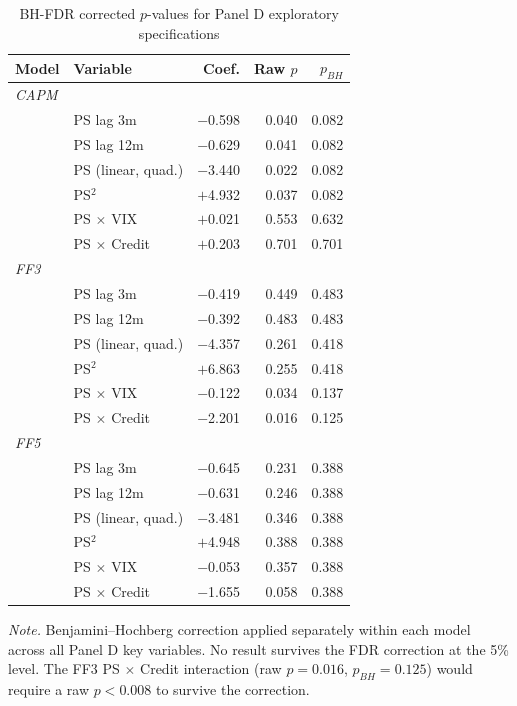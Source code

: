 \documentclass[11pt, a4paper]{article}
\begin{document}
\begin{table}[H]
\centering
\caption{BH-FDR corrected $p$-values for Panel D exploratory specifications}
\label{tab:app_fdr}
\small
\begin{tabular}{llrrr}
\toprule
\textbf{Model} & \textbf{Variable} & \textbf{Coef.} & \textbf{Raw $p$} & \textbf{$p_{BH}$} \\
\midrule
\multicolumn{5}{l}{\textit{CAPM}} \\
 & PS lag 3m        & $-$0.598 & 0.040 & 0.082 \\
 & PS lag 12m       & $-$0.629 & 0.041 & 0.082 \\
 & PS (linear, quad.)& $-$3.440 & 0.022 & 0.082 \\
 & PS$^2$           & $+$4.932 & 0.037 & 0.082 \\
 & PS $\times$ VIX  & $+$0.021 & 0.553 & 0.632 \\
 & PS $\times$ Credit & $+$0.203 & 0.701 & 0.701 \\
\midrule
\multicolumn{5}{l}{\textit{FF3}} \\
 & PS lag 3m        & $-$0.419 & 0.449 & 0.483 \\
 & PS lag 12m       & $-$0.392 & 0.483 & 0.483 \\
 & PS (linear, quad.)& $-$4.357 & 0.261 & 0.418 \\
 & PS$^2$           & $+$6.863 & 0.255 & 0.418 \\
 & PS $\times$ VIX  & $-$0.122 & 0.034 & 0.137 \\
 & PS $\times$ Credit & $-$2.201 & 0.016 & 0.125 \\
\midrule
\multicolumn{5}{l}{\textit{FF5}} \\
 & PS lag 3m        & $-$0.645 & 0.231 & 0.388 \\
 & PS lag 12m       & $-$0.631 & 0.246 & 0.388 \\
 & PS (linear, quad.)& $-$3.481 & 0.346 & 0.388 \\
 & PS$^2$           & $+$4.948 & 0.388 & 0.388 \\
 & PS $\times$ VIX  & $-$0.053 & 0.357 & 0.388 \\
 & PS $\times$ Credit & $-$1.655 & 0.058 & 0.388 \\
\bottomrule
\end{tabular}
\begin{flushleft}
\small\textit{Note.} Benjamini--Hochberg correction applied separately within each model across all Panel D key variables. No result survives the FDR correction at the 5\% level. The FF3 PS $\times$ Credit interaction (raw $p = 0.016$, $p_{BH} = 0.125$) would require a raw $p < 0.008$ to survive the correction.
\end{flushleft}
\end{table}
\end{document}
